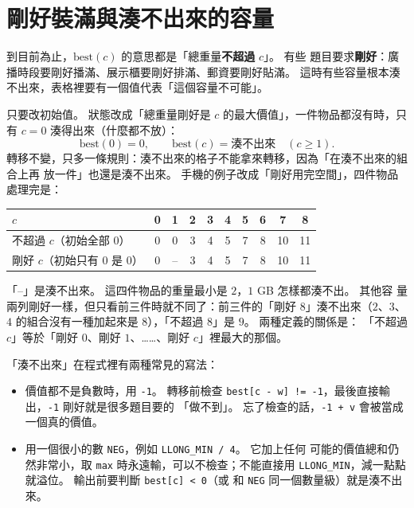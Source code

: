\section{剛好裝滿與湊不出來的容量}
\label{sec:knap-exact}

到目前為止，$\mathrm{best}(c)$ 的意思都是「總重量\textbf{不超過} $c$」。 有些
題目要求\textbf{剛好}：廣播時段要剛好播滿、展示櫃要剛好排滿、郵資要剛好貼滿。
這時有些容量根本湊不出來，表格裡要有一個值代表「這個容量不可能」。

只要改初始值。 狀態改成「總重量剛好是 $c$ 的最大價值」，一件物品都沒有時，只
有 $c = 0$ 湊得出來（什麼都不放）：
\[
\mathrm{best}(0) = 0,\qquad \mathrm{best}(c) = \text{湊不出來}\quad (c \ge 1).
\]
轉移不變，只多一條規則：湊不出來的格子不能拿來轉移，因為「在湊不出來的組合上再
放一件」也還是湊不出來。 手機的例子改成「剛好用完空間」，四件物品處理完是：

\begin{center}
\begin{tabular}{l|ccccccccc}
\toprule
$c$ & 0 & 1 & 2 & 3 & 4 & 5 & 6 & 7 & 8 \\
\midrule
不超過 $c$（初始全部 $0$） & 0 & 0 & 3 & 4 & 5 & 7 & 8 & 10 & 11 \\
剛好 $c$（初始只有 $0$ 是 $0$） & 0 & -- & 3 & 4 & 5 & 7 & 8 & 10 & 11 \\
\bottomrule
\end{tabular}
\end{center}

「--」是湊不出來。 這四件物品的重量最小是 $2$，$1$ GB 怎樣都湊不出。 其他容
量兩列剛好一樣，但只看前三件時就不同了：前三件的「剛好 $8$」湊不出來（$2$、$3$、
$4$ 的組合沒有一種加起來是 $8$），「不超過 $8$」是 $9$。 兩種定義的關係是：
「不超過 $c$」等於「剛好 $0$、剛好 $1$、……、剛好 $c$」裡最大的那個。

「湊不出來」在程式裡有兩種常見的寫法：

\begin{itemize}
\item 價值都不是負數時，用 \texttt{-1}。 轉移前檢查
\texttt{best[c - w] != -1}，最後直接輸出，\texttt{-1} 剛好就是很多題目要的
「做不到」。 忘了檢查的話，\texttt{-1 + v} 會被當成一個真的價值。
\item 用一個很小的數 \texttt{NEG}，例如 \texttt{LLONG\_MIN / 4}。 它加上任何
可能的價值總和仍然非常小，取 \texttt{max} 時永遠輸，可以不檢查；不能直接用
\texttt{LLONG\_MIN}，減一點點就溢位。 輸出前要判斷 \texttt{best[c] < 0}（或
和 \texttt{NEG} 同一個數量級）就是湊不出來。
\end{itemize}

